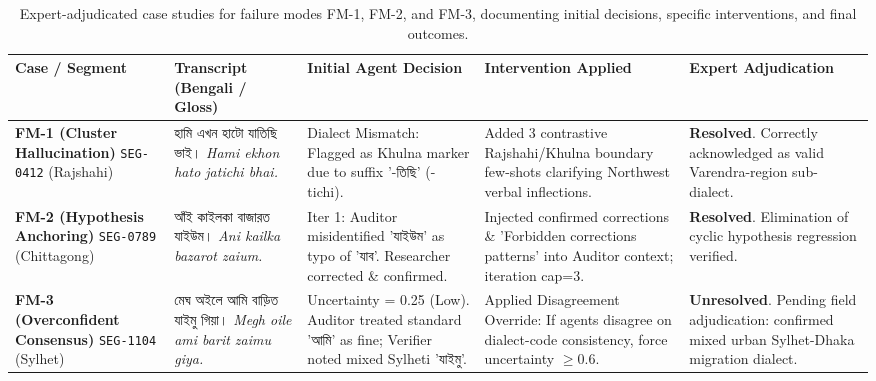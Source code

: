 
\begin{table}[t]
\centering
\footnotesize
\caption{Expert-adjudicated case studies for failure modes FM-1, FM-2, and FM-3, documenting initial decisions, specific interventions, and final outcomes.}
\label{tab:case_studies}
\begin{tabularx}{\textwidth}{lp{3.2cm}p{3.5cm}p{3.5cm}p{3.5cm}}
\toprule
\textbf{Case / Segment} & \textbf{Transcript (Bengali / Gloss)} & \textbf{Initial Agent Decision} & \textbf{Intervention Applied} & \textbf{Expert Adjudication} \\
\midrule
\textbf{FM-1 (Cluster Hallucination)} \newline \texttt{SEG-0412} (Rajshahi) & 
হামি এখন হাটো যাতিছি ভাই। \newline \textit{Hami ekhon hato jatichi bhai.} & 
Dialect Mismatch: Flagged as Khulna marker due to suffix '-তিছি' (-tichi). & 
Added 3 contrastive Rajshahi/Khulna boundary few-shots clarifying Northwest verbal inflections. & 
\textbf{Resolved}. Correctly acknowledged as valid Varendra-region sub-dialect. \\
\midrule
\textbf{FM-2 (Hypothesis Anchoring)} \newline \texttt{SEG-0789} (Chittagong) & 
আঁই কাইলকা বাজারত যাইউম। \newline \textit{Ani kailka bazarot zaium.} & 
Iter 1: Auditor misidentified 'যাইউম' as typo of 'যাব'. Researcher corrected \& confirmed. & 
Injected confirmed corrections \& 'Forbidden corrections patterns' into Auditor context; iteration cap=3. & 
\textbf{Resolved}. Elimination of cyclic hypothesis regression verified. \\
\midrule
\textbf{FM-3 (Overconfident Consensus)} \newline \texttt{SEG-1104} (Sylhet) & 
মেঘ অইলে আমি বাড়িত যাইমু গিয়া। \newline \textit{Megh oile ami barit zaimu giya.} & 
Uncertainty = 0.25 (Low). Auditor treated standard 'আমি' as fine; Verifier noted mixed Sylheti 'যাইমু'. & 
Applied Disagreement Override: If agents disagree on dialect-code consistency, force uncertainty $\ge 0.6$. & 
\textbf{Unresolved}. Pending field adjudication: confirmed mixed urban Sylhet-Dhaka migration dialect. \\
\bottomrule
\end{tabularx}
\end{table}
